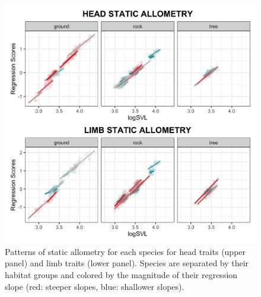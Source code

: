 \documentclass[
  11pt,
]{article}
\begin{document}
\begin{figure}

{\centering \includegraphics[width=1\linewidth]{Figs/figure_4_static_allometry} 

}

\caption{Patterns of static allometry for each species for head traits (upper panel) and limb traits (lower panel). Species are separated by their habitat groups and colored by the magnitude of their regression slope (red: steeper slopes, blue: shallower slopes).}\label{fig:unnamed-chunk-7}
\end{figure}

\newpage
\end{document}
